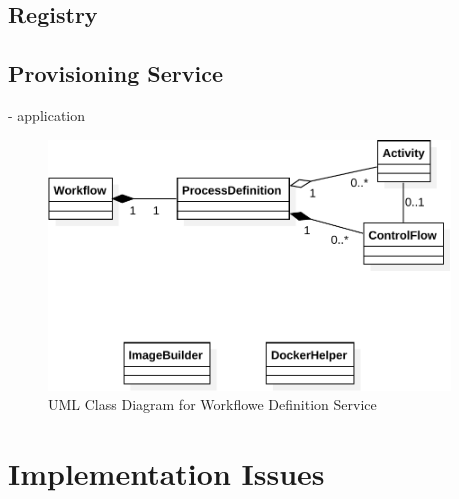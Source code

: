 
  \subsection{Registry} %
    \label{sub:registry}

  \subsection{Provisioning Service} %
    \label{sub:provisioning_service}
      - application


\begin{figure}[htbp]
  \centering
  \includegraphics[width=0.95\textwidth]{content/images/class_d_definition-crop.pdf}
  \caption{UML Class Diagram for Workflowe Definition Service}
  \label{fig:uml_class_diagram_definition_service}
\end{figure}

\section{Implementation Issues} %
\label{sec:implementation_issues}

